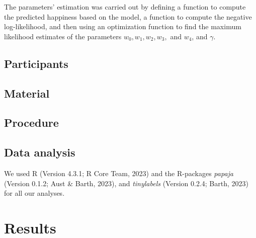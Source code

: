 \documentclass[
  man]{apa6}
\begin{document}
The parameters' estimation was carried out by defining a function to compute the predicted happiness based on the model, a function to compute the negative log-likelihood, and then using an optimization function to find the maximum likelihood estimates of the parameters \(w_0, w_1, w_2, w_3,\) and \(w_4\), and \(\gamma\).

\hypertarget{participants}{%
\subsection{Participants}\label{participants}}

\hypertarget{material}{%
\subsection{Material}\label{material}}

\hypertarget{procedure}{%
\subsection{Procedure}\label{procedure}}

\hypertarget{data-analysis}{%
\subsection{Data analysis}\label{data-analysis}}

We used R (Version 4.3.1; R Core Team, 2023) and the R-packages \emph{papaja} (Version 0.1.2; Aust \& Barth, 2023), and \emph{tinylabels} (Version 0.2.4; Barth, 2023) for all our analyses.

\hypertarget{results}{%
\section{Results}\label{results}}
\end{document}
